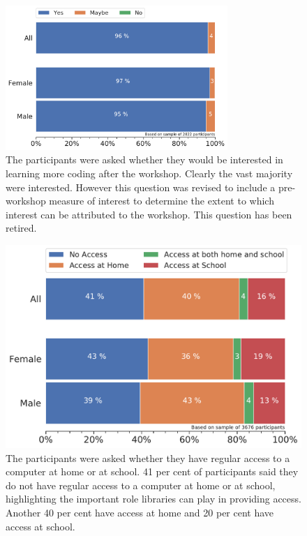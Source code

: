 \documentclass[12pt]{report} %
\begin{document}
\begin{figure}[t!]
    \centering
        \includegraphics[width=0.75\textwidth]{bar_learnmore}
\caption{The participants were asked whether they would be interested in learning more coding after the workshop. Clearly the vast majority were interested. However this question was revised to include a pre-workshop measure of interest to determine the extent to which interest can be attributed to the workshop. This question has been retired.} 
\label{fig:learnmore}
\end{figure}

\begin{figure}[t!]
    \centering
        \includegraphics[width=1\textwidth]{bar_ITaccess}
\caption{The participants were asked whether they have regular access to a computer at home or at school. 41 per cent of participants said they do not have regular access to a computer at home or at school, highlighting the important role libraries can play in providing access. Another 40 per cent have access at home and 20 per cent have access at school. } 
\label{fig:itaccess}
\end{figure}
\end{document}
